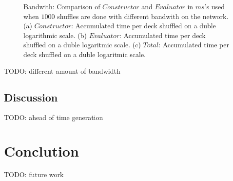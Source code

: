 \documentclass[twoside,11pt,openright]{report}
\newcommand{\todo}[1]{}
\renewcommand{\todo}[1]{{\color{red} TODO: {#1}} \\}
\begin{document}
\begin{figure}
    \begin{subfigure}{\textwidth}
        \centering
        \caption{}
        \label{fig:total_bandwith_plot}
    \end{subfigure}
    \caption{Bandwith: Comparison of $Constructor$ and $Evaluator$ in $ms$'s used when $1000$ shuffles are done with different bandwith on the network. (a) $Constructor$: Accumulated time per deck shuffled on a duble logarithmic scale. (b) $Evaluator$: Accumulated time per deck shuffled on a duble logaritmic scale. (c) $Total$: Accumulated time per deck shuffled on a duble logaritmic scale.}
    \label{fig:mesurement_bandwith}
\end{figure}

\todo{different amount of bandwidth}

\section{Discussion}
\label{sec:discussion}

\todo{ahead of time generation}



\chapter{Conclution}
\label{ch:conclution}

\todo{future work}

\end{document}
